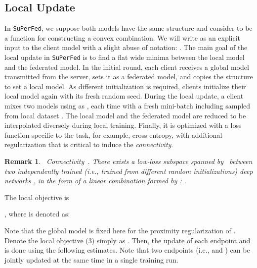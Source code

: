 \documentclass[sigconf]{acmart}
\newtheorem{Remark}{Remark}
\begin{document}
\subsection{Local Update} In \texttt{SuPerFed}, we suppose both models  have the same structure and consider  to be a function for constructing a convex combination. We will write  as an explicit input to the client model with a slight abuse of notation: .
The main goal of the local update in \texttt{SuPerFed} is to find a flat wide minima between the local model and the federated model. In the initial round, each client receives a global model transmitted from the server, sets it as a federated model, and copies the structure to set a local model. As different initialization is required, clients initialize their local model again with its fresh random seed.
During the local update, a client mixes two models using  as , each time with a fresh mini-batch including  sampled from local dataset . The local model and the federated model are reduced to be interpolated diversely during local training. Finally, it is optimized with a loss function  specific to the task, for example, cross-entropy, with additional regularization  that is critical to induce the \textit{connectivity}.

\medskip
\begin{Remark}~Connectivity~\cite{frankle20, nnsubspaces}. There exists a low-loss subspace spanned by~ between two independently trained (i.e., trained from different random initializations) deep networks , in the form of a linear combination formed by : .
\end{Remark}

\medskip
\noindent
The local objective is

, where  is denoted as:

Note that the global model  is fixed here for the proximity regularization of . 
Denote the local objective (3) simply as . Then, the update of each endpoint  and  is done using the following estimates. Note that two endpoints (i.e.,  and ) can be jointly updated at the same time in a single training run. 
\end{document}
